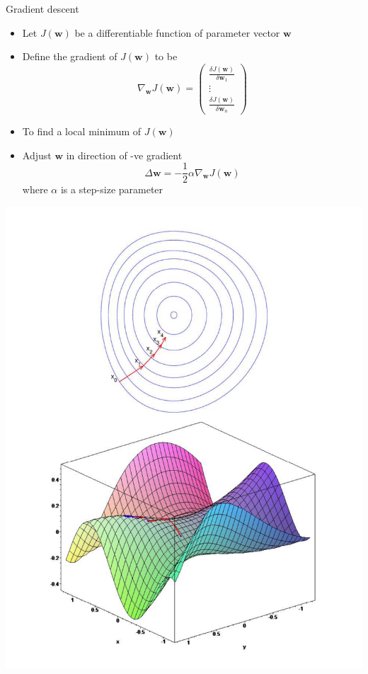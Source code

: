 \bgroup
\begin{frame}{Gradient descent}
\begin{minipage}{0.6\textwidth}
\begin{itemize}
\item Let $J(\textbf{w})$ be a differentiable function of parameter vector $\textbf{w}$
\item Define the gradient of $J(\textbf{w})$ to be 
\begin{equation*}
\nabla_{\textbf{w}}J(\textbf{w})=\left(
                \begin{array}{c}
                  \frac{\delta J(\textbf{w})}{\delta \textbf{w}_1}\\
                  \vdots\\
                  \frac{\delta J(\textbf{w})}{\delta \textbf{w}_n}
                \end{array}
              \right)
\end{equation*}
\item To find a local minimum of $J(\textbf{w})$
\item Adjust $\textbf{w}$ in direction of -ve gradient
\begin{equation*}
\Delta \textbf{w} = -\frac{1}{2}\alpha\nabla_{\textbf{w}} J(\textbf{w})
\end{equation*}
where $\alpha$ is a step-size parameter
\end{itemize}
\end{minipage}
\begin{minipage}{0.35\textwidth}
\includegraphics[width=\textwidth]{img/gd.pdf}
\end{minipage}
\end{frame}
\egroup